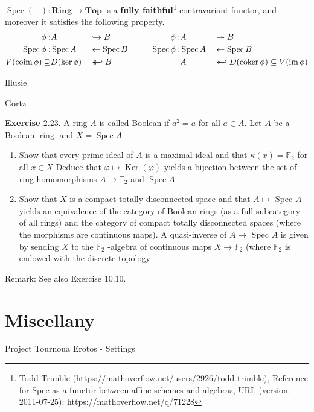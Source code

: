 \documentclass[10pt]{report}
\theoremstyle{definition}
\newcommand{\hookdoubleheadleftarrow}{%
  \leftarrow\mathrel{\mspace{-15mu}}\hookleftarrow
}
\begin{document}
$\operatorname{Spec}(-):\mathbf{Ring}\to\mathbf{Top}$ is a \textbf{fully faithful}\footnote{Todd Trimble (https://mathoverflow.net/users/2926/todd-trimble), Reference for Spec as a functor between affine schemes and algebras, URL (version: 2011-07-25): https://mathoverflow.net/q/71228} contravariant functor, and moreover it satisfies the following property.
$$
\begin{aligned}
\phi:&A&&\hookrightarrow B\\
\operatorname{Spec}\phi:&\operatorname{Spec}A&&\leftarrow\operatorname{Spec}B\\
V(\operatorname{coim}\phi)\supseteq&D(\operatorname{ker}\phi)&&\hookdoubleheadleftarrow{}B
\end{aligned}\quad\quad\quad
\begin{aligned}
\phi:&A&&\twoheadrightarrow B\\
\operatorname{Spec}\phi:&\operatorname{Spec}A&&\leftarrow\operatorname{Spec}B\\
&A&&\hookdoubleheadleftarrow{}D(\operatorname{coker}\phi)\subseteq V(\operatorname{im}\phi)
\end{aligned}
$$

{\Large Illusie}




{\Large G\"ortz}

\textbf{Exercise $2.23 .$} A ring $A$ is called Boolean if $a^{2}=a$ for all $a \in A .$ Let $A$ be a Boolean $\operatorname{ring}$ and $X=\operatorname{Spec} A$
\begin{enumerate}[label=(\alph*)]
\item
Show that every prime ideal of $A$ is a maximal ideal and that $\kappa(x)=\mathbb{F}_{2}$ for all $x \in X$ Deduce that $\varphi \mapsto \operatorname{Ker}(\varphi)$ yields a bijection between the set of ring homomorphisms $A \rightarrow \mathbb{F}_{2}$ and $\operatorname{Spec} A$
\item
Show that $X$ is a compact totally disconnected space and that $A \mapsto$ Spec $A$ yields an equivalence of the category of Boolean rings (as a full subcategory of all rings) and the category of compact totally disconnected spaces (where the morphisms are continuous maps). A quasi-inverse of $A \mapsto$ Spec $A$ is given by sending $X$ to the $\mathbb{F}_{2}$ -algebra of continuous maps $X \rightarrow \mathbb{F}_{2}$ (where $\mathbb{F}_{2}$ is endowed with the discrete topology
\end{enumerate}
Remark: See also Exercise $10.10 .$

\chapter{Miscellany}
\newpage
{\Large Project Tournoua Erotos - Settings}
\end{document}
